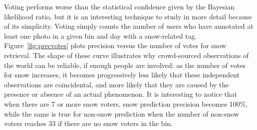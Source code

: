 



  Voting performs worse than the statistical confidence
given by the Bayesian likelihood ratio, but it is an interesting
technique to study in more detail because of its simplicity. Voting
simply counts the number of users who have annotated at least one
photo in a given bin and day with a snow-related tag.
Figure~\ref{fig:precvotes}
plots precision versus the number of votes for snow retrieval.  The
shape of these curve illustrates why crowd-sourced observations of the
world can be reliable, if enough people are involved: as the number of
votes for snow increases, it becomes progressively less likely that
these independent observations are coincidental, and more likely that
they are caused by the presence or absence of an actual phenomenon.
It is interesting to notice that when there are 7 or more snow voters,
snow prediction precision becomes 100\%, while the same is true for
non-snow prediction when the number of non-snow voters reaches 33
if there are no snow voters in the bin.

